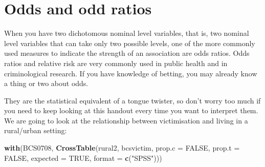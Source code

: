 \documentclass[
]{book}
\newenvironment{Shaded}{\begin{snugshade}}{\end{snugshade}}
\newcommand{\AttributeTok}[1]{\textcolor[rgb]{0.13,0.29,0.53}{#1}}
\newcommand{\ConstantTok}[1]{\textcolor[rgb]{0.56,0.35,0.01}{#1}}
\newcommand{\FunctionTok}[1]{\textcolor[rgb]{0.13,0.29,0.53}{\textbf{#1}}}
\newcommand{\NormalTok}[1]{#1}
\newcommand{\StringTok}[1]{\textcolor[rgb]{0.31,0.60,0.02}{#1}}
\begin{document}
\section{Odds and odd ratios}\label{odds-and-odd-ratios}

When you have two dichotomous nominal level variables, that is, two nominal level variables that can take only two possible levels, one of the more commonly used measures to indicate the strength of an association are odds ratios. Odds ratios and relative risk are very commonly used in public health and in criminological research. If you have knowledge of betting, you may already know a thing or two about odds.

They are the statistical equivalent of a tongue twister, so don't worry too much if you need to keep looking at this handout every time you want to interpret them. We are going to look at the relationship between victimisation and living in a rural/urban setting:

\begin{Shaded}
\begin{Highlighting}[]
\FunctionTok{with}\NormalTok{(BCS0708, }\FunctionTok{CrossTable}\NormalTok{(rural2, bcsvictim, }\AttributeTok{prop.c =} \ConstantTok{FALSE}\NormalTok{, }\AttributeTok{prop.t =} \ConstantTok{FALSE}\NormalTok{, }\AttributeTok{expected =} \ConstantTok{TRUE}\NormalTok{, }\AttributeTok{format =} \FunctionTok{c}\NormalTok{(}\StringTok{"SPSS"}\NormalTok{)))}
\end{Highlighting}
\end{Shaded}
\end{document}
